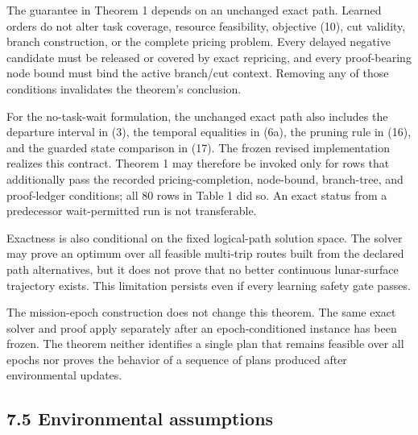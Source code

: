 \documentclass[
  11pt,
]{article}
\begin{document}
The guarantee in Theorem 1 depends on an unchanged exact path. Learned
orders do not alter task coverage, resource feasibility, objective (10),
cut validity, branch construction, or the complete pricing problem.
Every delayed negative candidate must be released or covered by exact
repricing, and every proof-bearing node bound must bind the active
branch/cut context. Removing any of those conditions invalidates the
theorem's conclusion.

For the no-task-wait formulation, the unchanged exact path also includes
the departure interval in (3), the temporal equalities in (6a), the
pruning rule in (16), and the guarded state comparison in (17). The
frozen revised implementation realizes this contract. Theorem 1 may
therefore be invoked only for rows that additionally pass the recorded
pricing-completion, node-bound, branch-tree, and proof-ledger
conditions; all 80 rows in Table 1 did so. An exact status from a
predecessor wait-permitted run is not transferable.

Exactness is also conditional on the fixed logical-path solution space.
The solver may prove an optimum over all feasible multi-trip routes
built from the declared path alternatives, but it does not prove that no
better continuous lunar-surface trajectory exists. This limitation
persists even if every learning safety gate passes.

The mission-epoch construction does not change this theorem. The same
exact solver and proof apply separately after an epoch-conditioned
instance has been frozen. The theorem neither identifies a single plan
that remains feasible over all epochs nor proves the behavior of a
sequence of plans produced after environmental updates.

\hypertarget{environmental-assumptions}{%
\subsection{7.5 Environmental
assumptions}\label{environmental-assumptions}}
\end{document}
